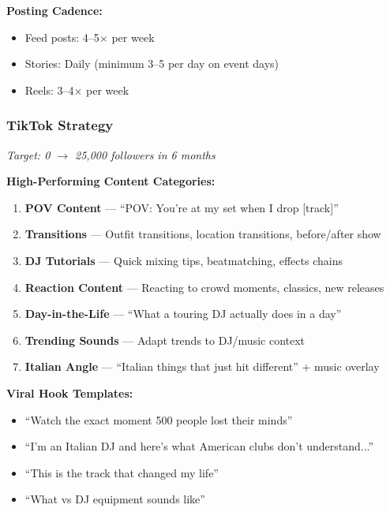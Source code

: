 \documentclass[11pt,a4paper]{article}
\begin{document}
\noindent\textbf{Posting Cadence:}
\begin{itemize}[leftmargin=*]
    \item Feed posts: 4--5$\times$ per week
    \item Stories: Daily (minimum 3--5 per day on event days)
    \item Reels: 3--4$\times$ per week
\end{itemize}

\subsubsection{TikTok Strategy}
\textit{Target: 0 $\rightarrow$ 25,000 followers in 6 months}

\vspace{0.5em}
\noindent\textbf{High-Performing Content Categories:}

\begin{enumerate}[leftmargin=*]
    \item \textbf{POV Content} --- ``POV: You're at my set when I drop [track]''
    \item \textbf{Transitions} --- Outfit transitions, location transitions, before/after show
    \item \textbf{DJ Tutorials} --- Quick mixing tips, beatmatching, effects chains
    \item \textbf{Reaction Content} --- Reacting to crowd moments, classics, new releases
    \item \textbf{Day-in-the-Life} --- ``What a touring DJ actually does in a day''
    \item \textbf{Trending Sounds} --- Adapt trends to DJ/music context
    \item \textbf{Italian Angle} --- ``Italian things that just hit different'' + music overlay
\end{enumerate}

\noindent\textbf{Viral Hook Templates:}
\begin{itemize}[leftmargin=*]
    \item ``Watch the exact moment 500 people lost their minds''
    \item ``I'm an Italian DJ and here's what American clubs don't understand...''
    \item ``This is the track that changed my life''
    \item ``What  vs  DJ equipment sounds like''
\end{itemize}
\end{document}
